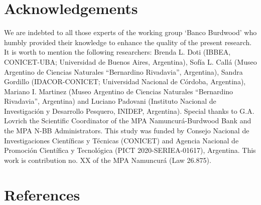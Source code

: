 \documentclass[preprint, 3p,
authoryear]{elsarticle} %
\begin{document}
\hypertarget{acknowledgements}{%
\section{Acknowledgements}\label{acknowledgements}}

We are indebted to all those experts of the working group `Banco
Burdwood' who humbly provided their knowledge to enhance the quality of
the present research. It is worth to mention the following researchers:
Brenda L. Doti (IBBEA, CONICET-UBA; Universidad de Buenos Aires,
Argentina), Sofía L. Callá (Museo Argentino de Ciencias Naturales
``Bernardino Rivadavia'', Argentina), Sandra Gordillo (IDACOR-CONICET;
Universidad Nacional de Córdoba, Argentina), Mariano I. Martinez (Museo
Argentino de Ciencias Naturales ``Bernardino Rivadavia'', Argentina) and
Luciano Padovani (Instituto Nacional de Investigación y Desarrollo
Pesquero, INIDEP, Argentina). Special thanks to G.A. Lovrich the
Scientific Coordinator of the MPA Namuncurá-Burdwood Bank and the MPA
N-BB Administrators. This study was funded by Consejo Nacional de
Investigaciones Científicas y Técnicas (CONICET) and Agencia Nacional de
Promoción Científica y Tecnológica (PICT 2020-SERIEA-01617), Argentina.
This work is contribution no. XX of the MPA Namuncurá (Law 26.875).

\hypertarget{references}{%
\section*{References}\label{references}}
\end{document}

